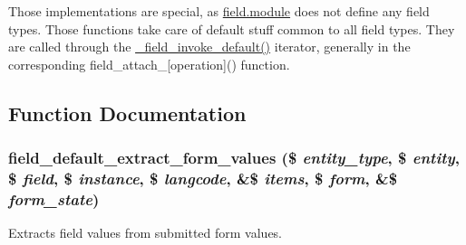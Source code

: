 Those implementations are special, as \hyperlink{field_8module}{field.module} does not define any field types. Those functions take care of default stuff common to all field types. They are called through the \hyperlink{group__field__attach_gaf000872e1850750f98445dfa96bfb602}{\_\-field\_\-invoke\_\-default()} iterator, generally in the corresponding field\_\-attach\_\-\mbox{[}operation\mbox{]}() function. 

\subsection{Function Documentation}
\hypertarget{field_8default_8inc_af49a2ff85415c7a71362387e849ba28d}{
\subsubsection[{field\_\-default\_\-extract\_\-form\_\-values}]{\setlength{\rightskip}{0pt plus 5cm}field\_\-default\_\-extract\_\-form\_\-values (\$ {\em entity\_\-type}, \/  \$ {\em entity}, \/  \$ {\em field}, \/  \$ {\em instance}, \/  \$ {\em langcode}, \/  \&\$ {\em items}, \/  \$ {\em form}, \/  \&\$ {\em form\_\-state})}}
\label{field_8default_8inc_af49a2ff85415c7a71362387e849ba28d}
Extracts field values from submitted form values.


